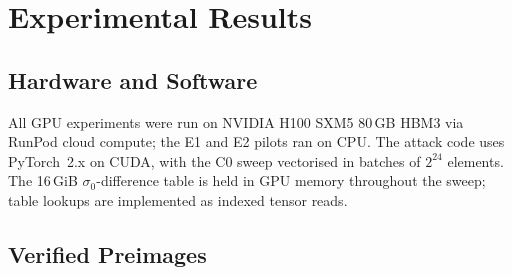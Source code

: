 \documentclass[11pt,a4paper]{article}
\begin{document}
\section{Experimental Results}
\label{sec:experiments}

\subsection{Hardware and Software}

All GPU experiments were run on NVIDIA H100 SXM5 80\,GB HBM3 via RunPod
cloud compute; the E1 and E2 pilots ran on CPU.  The attack code uses
PyTorch~2.x on CUDA, with the C0 sweep vectorised in batches of $2^{24}$
elements.  The 16\,GiB $\sigma_0$-difference table is held in GPU memory
throughout the
sweep; table lookups are implemented as indexed tensor reads.

\subsection{Verified Preimages}
\end{document}
